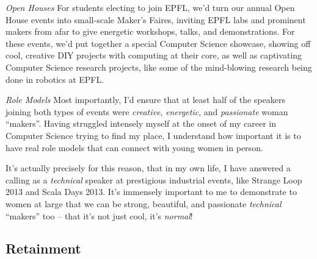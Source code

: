\documentclass[acmtocl]{acmtrans2m}
\begin{document}
\textit{\textsf{Open Houses}}\newline
For students electing to join EPFL, we'd turn our annual Open House events
into {small-scale} Maker's Faires, inviting EPFL labs and prominent makers
from afar to give energetic workshops, talks, and demonstrations. For these
events, we'd put together a special Computer Science showcase, showing
off cool, creative DIY projects with computing at their core, as well as
captivating Computer Science research projects, like some of the mind-blowing
research being done in robotics at EPFL.

\textit{\textsf{Role Models}}\newline
Most importantly, I'd ensure that at least half of the speakers joining both
types of events were \textit{creative}, \textit{energetic}, and
\textit{passionate} woman ``makers''. Having struggled intensely myself at the
onset of my career in Computer Science trying to find my place, I understand
how important it is to have real role models that can connect with young women
in person.

It's actually precisely for this reason, that in my own life, I have answered
a calling as a \textit{technical} speaker at prestigious industrial events,
like Strange Loop 2013 and Scala Days 2013. It's immensely important to me to
demonstrate to women at large that we can be strong, beautiful, and passionate
\textit{technical}  ``makers'' too -- that it's not just cool, it's \textit{normal}!




\vspace{-0.15in}
\subsection*{\textbf{Retainment}}
\vspace{-0.1in}
\end{document}
